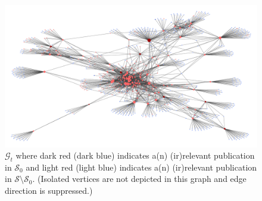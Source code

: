 \documentclass[11pt,a4paper]{book}
\theoremstyle{definition}
\theoremstyle{definition}
\theoremstyle{definition}
\theoremstyle{remark}
\newcommand{\pset}{S}
\newcommand{\xset}{\mathcal{S}}
\newcommand{\xsetz}{\mathcal{S}_{\mathit{0}}}
\newcommand{\tgraph}{\mathcal{G}_{t}}
\newcommand{\pgraph}{\mathcal{G}_{p}}
\begin{document}
\begin{figure}
\includegraphics[width=\textwidth]{whole_graph.png}
\caption{$\tgraph$ where \textcolor{start_relevant}{dark red}  (\textcolor{start_nrelevant}{dark blue}) indicates a(n) (ir)relevant publication in $\xsetz$ and \textcolor{other_relevant}{light red}  (\textcolor{other_nrelevant}{light blue}) indicates a(n) (ir)relevant publication in $\xset\setminus \xsetz$. (Isolated vertices are not depicted in this graph and edge direction is suppressed.)}
\label{fig:pgraph-whole_graph}
\end{figure}



\end{document}
